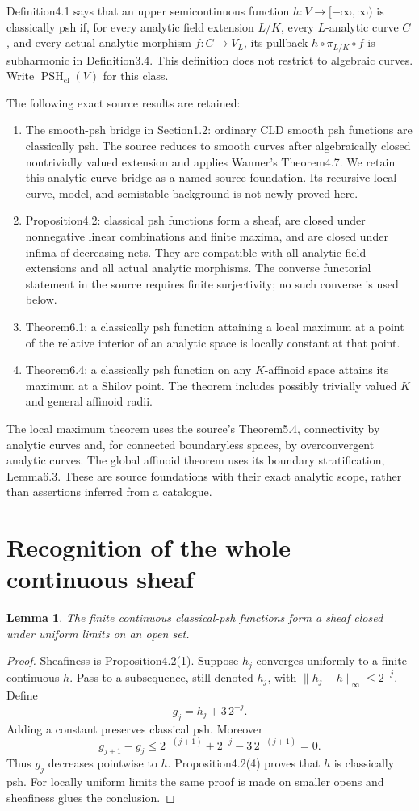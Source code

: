 \documentclass[11pt]{article}
\newtheorem{lemma}[theorem]{Lemma}
\newcommand{\PSH}{\operatorname{PSH}_{\mathrm{cl}}}
\begin{document}
Definition4.1 says that an upper semicontinuous function
$h:V\to[-\infty,\infty)$ is classically psh if, for every analytic
field extension $L/K$, every $L$-analytic curve $C$, and every actual
analytic morphism $f:C\to V_L$, its pullback
$h\circ\pi_{L/K}\circ f$ is subharmonic in Definition3.4. This definition
does not restrict to algebraic curves. Write $\PSH(V)$ for this class.

The following exact source results are retained:
\begin{enumerate}
\item The smooth-psh bridge in Section1.2: ordinary CLD smooth psh
functions are classically psh. The source reduces to smooth curves after
algebraically closed nontrivially valued extension and applies Wanner's
Theorem4.7. We retain this analytic-curve bridge as a named source
foundation. Its recursive local curve, model, and semistable background
is not newly proved here.
\item Proposition4.2: classical psh functions form a sheaf, are closed
under nonnegative linear combinations and finite maxima, and are closed
under infima of decreasing nets. They are compatible with all analytic
field extensions and all actual analytic morphisms. The converse
functorial statement in the source requires finite surjectivity; no such
converse is used below.
\item Theorem6.1: a classically psh function attaining a local maximum
at a point of the relative interior of an analytic space is locally
constant at that point.
\item Theorem6.4: a classically psh function on any $K$-affinoid space
attains its maximum at a Shilov point. The theorem includes possibly
trivially valued $K$ and general affinoid radii.
\end{enumerate}
The local maximum theorem uses the source's Theorem5.4, connectivity by
analytic curves and, for connected boundaryless spaces, by overconvergent
analytic curves. The global affinoid theorem uses its boundary
stratification, Lemma6.3. These are source foundations with their exact
analytic scope, rather than assertions inferred from a catalogue.

\section{Recognition of the whole continuous sheaf}
\begin{lemma}\label{uniform}
The finite continuous classical-psh functions form a sheaf closed under
uniform limits on an open set.
\end{lemma}
\begin{proof}
Sheafiness is Proposition4.2(1). Suppose $h_j$ converges uniformly to a
finite continuous $h$. Pass to a subsequence, still denoted $h_j$, with
$\|h_j-h\|_\infty\le2^{-j}$. Define
\[
 g_j=h_j+3\,2^{-j}.
\]
Adding a constant preserves classical psh. Moreover
\[
 g_{j+1}-g_j
 \le 2^{-(j+1)}+2^{-j}-3\,2^{-(j+1)}=0.
\]
Thus $g_j$ decreases pointwise to $h$. Proposition4.2(4) proves that
$h$ is classically psh. For locally uniform limits the same proof is
made on smaller opens and sheafiness glues the conclusion.
\end{proof}
\end{document}
